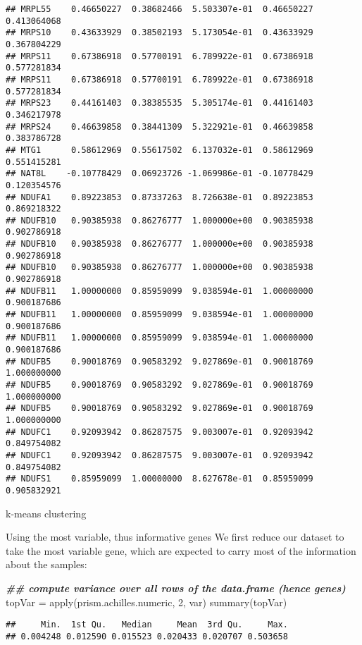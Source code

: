 \documentclass[
]{article}
\newenvironment{Shaded}{\begin{snugshade}}{\end{snugshade}}
\newcommand{\DecValTok}[1]{\textcolor[rgb]{0.00,0.00,0.81}{#1}}
\newcommand{\DocumentationTok}[1]{\textcolor[rgb]{0.56,0.35,0.01}{\textbf{\textit{#1}}}}
\newcommand{\FunctionTok}[1]{\textcolor[rgb]{0.00,0.00,0.00}{#1}}
\newcommand{\NormalTok}[1]{#1}
\newcommand{\OtherTok}[1]{\textcolor[rgb]{0.56,0.35,0.01}{#1}}
\begin{document}
\begin{verbatim}
## MRPL55    0.46650227  0.38682466  5.503307e-01  0.46650227  0.413064068
## MRPS10    0.43633929  0.38502193  5.173054e-01  0.43633929  0.367804229
## MRPS11    0.67386918  0.57700191  6.789922e-01  0.67386918  0.577281834
## MRPS11    0.67386918  0.57700191  6.789922e-01  0.67386918  0.577281834
## MRPS23    0.44161403  0.38385535  5.305174e-01  0.44161403  0.346217978
## MRPS24    0.46639858  0.38441309  5.322921e-01  0.46639858  0.383786728
## MTG1      0.58612969  0.55617502  6.137032e-01  0.58612969  0.551415281
## NAT8L    -0.10778429  0.06923726 -1.069986e-01 -0.10778429  0.120354576
## NDUFA1    0.89223853  0.87337263  8.726638e-01  0.89223853  0.869218322
## NDUFB10   0.90385938  0.86276777  1.000000e+00  0.90385938  0.902786918
## NDUFB10   0.90385938  0.86276777  1.000000e+00  0.90385938  0.902786918
## NDUFB10   0.90385938  0.86276777  1.000000e+00  0.90385938  0.902786918
## NDUFB11   1.00000000  0.85959099  9.038594e-01  1.00000000  0.900187686
## NDUFB11   1.00000000  0.85959099  9.038594e-01  1.00000000  0.900187686
## NDUFB11   1.00000000  0.85959099  9.038594e-01  1.00000000  0.900187686
## NDUFB5    0.90018769  0.90583292  9.027869e-01  0.90018769  1.000000000
## NDUFB5    0.90018769  0.90583292  9.027869e-01  0.90018769  1.000000000
## NDUFB5    0.90018769  0.90583292  9.027869e-01  0.90018769  1.000000000
## NDUFC1    0.92093942  0.86287575  9.003007e-01  0.92093942  0.849754082
## NDUFC1    0.92093942  0.86287575  9.003007e-01  0.92093942  0.849754082
## NDUFS1    0.85959099  1.00000000  8.627678e-01  0.85959099  0.905832921
\end{verbatim}

k-means clustering

Using the most variable, thus informative genes We first reduce our
dataset to take the most variable gene, which are expected to carry most
of the information about the samples:

\begin{Shaded}
\begin{Highlighting}[]
\DocumentationTok{\#\# compute variance over all rows of the data.frame (hence genes)}
\NormalTok{topVar }\OtherTok{=} \FunctionTok{apply}\NormalTok{(prism.achilles.numeric, }\DecValTok{2}\NormalTok{, var) }
\FunctionTok{summary}\NormalTok{(topVar)}
\end{Highlighting}
\end{Shaded}

\begin{verbatim}
##     Min.  1st Qu.   Median     Mean  3rd Qu.     Max. 
## 0.004248 0.012590 0.015523 0.020433 0.020707 0.503658
\end{verbatim}
\end{document}
